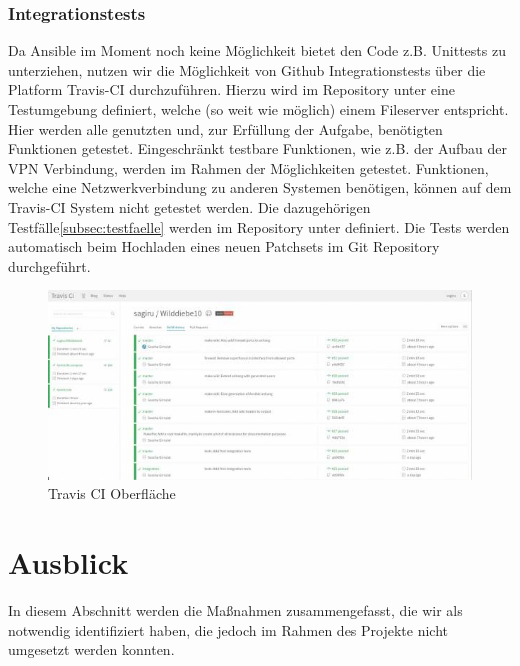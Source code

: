 \subsubsection{Integrationstests}
Da Ansible im Moment noch keine Möglichkeit bietet den Code z.B. Unittests zu unterziehen, nutzen wir die Möglichkeit von Github Integrationstests über die Platform Travis-CI durchzuführen. Hierzu wird im Repository unter \newline  {} eine Testumgebung definiert, welche (so weit wie möglich) einem Fileserver entspricht. Hier werden alle genutzten und, zur Erfüllung der Aufgabe, benötigten Funktionen getestet. Eingeschränkt testbare Funktionen, wie z.B. der Aufbau der VPN Verbindung, werden im Rahmen der Möglichkeiten getestet. Funktionen, welche eine Netzwerkverbindung zu anderen Systemen benötigen, können auf dem Travis-CI System nicht getestet werden. Die dazugehörigen Testfälle\ref{subsec:testfaelle} werden im Repository unter  definiert. Die Tests werden automatisch beim Hochladen eines neuen Patchsets im Git Repository durchgeführt.

\begin{figure}[!htbp]
	\centering
		\includegraphics[scale=0.75]{images/travisci.jpg}
	\caption{Travis CI Oberfläche}
	\label{img:travisci}
\end{figure}


\section{Ausblick}
\label{sec:ausblick}
In diesem Abschnitt werden die Maßnahmen zusammengefasst, die wir als notwendig identifiziert haben, die jedoch im Rahmen des Projekte nicht umgesetzt werden konnten.

